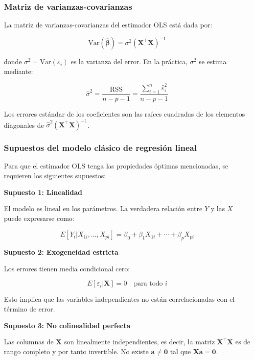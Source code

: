 \documentclass[
  doc,
  floatsintext,
  longtable,
  a4paper,
  nolmodern,
  notxfonts,
  notimes,
  12pt,
  colorlinks=true,linkcolor=blue,citecolor=blue,urlcolor=blue]{apa7}
\begin{document}
\subsubsection{Matriz de
varianzas-covarianzas}\label{matriz-de-varianzas-covarianzas}

La matriz de varianzas-covarianzas del estimador OLS está dada por:

\[
\text{Var}(\hat{\boldsymbol{\beta}}) = \sigma^2 (\mathbf{X}^\top\mathbf{X})^{-1}
\]

donde \(\sigma^2 = \text{Var}(\varepsilon_i)\) es la varianza del error.
En la práctica, \(\sigma^2\) se estima mediante:

\[
\hat{\sigma}^2 = \frac{\text{RSS}}{n - p - 1} = \frac{\sum_{i=1}^{n} \hat{\varepsilon}_i^2}{n - p - 1}
\]

Los errores estándar de los coeficientes son las raíces cuadradas de los
elementos diagonales de
\(\hat{\sigma}^2 (\mathbf{X}^\top\mathbf{X})^{-1}\).

\subsubsection{Supuestos del modelo clásico de regresión
lineal}\label{supuestos-del-modelo-cluxe1sico-de-regresiuxf3n-lineal}

Para que el estimador OLS tenga las propiedades óptimas mencionadas, se
requieren los siguientes supuestos:

\textbf{Supuesto 1: Linealidad}

El modelo es lineal en los parámetros. La verdadera relación entre \(Y\)
y las \(X\) puede expresarse como:

\[
E[Y_i | X_{1i}, \ldots, X_{pi}] = \beta_0 + \beta_1 X_{1i} + \cdots + \beta_p X_{pi}
\]

\textbf{Supuesto 2: Exogeneidad estricta}

Los errores tienen media condicional cero:

\[
E[\varepsilon_i | \mathbf{X}] = 0 \quad \text{para todo } i
\]

Esto implica que las variables independientes no están correlacionadas
con el término de error.

\textbf{Supuesto 3: No colinealidad perfecta}

Las columnas de \(\mathbf{X}\) son linealmente independientes, es decir,
la matriz \(\mathbf{X}^\top\mathbf{X}\) es de rango completo y por tanto
invertible. No existe \(\mathbf{a} \neq \mathbf{0}\) tal que
\(\mathbf{X}\mathbf{a} = \mathbf{0}\).
\end{document}
